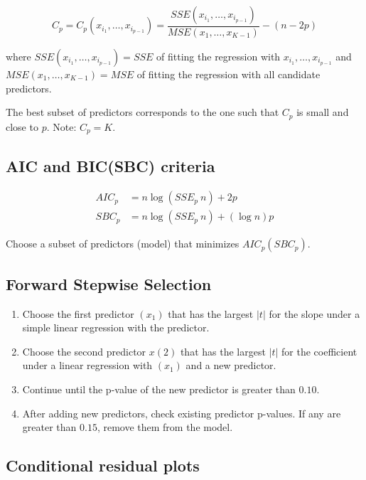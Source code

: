 \documentclass[10pt]{article}
\begin{document}
\begin{multicols}{3}
    \begin{equation}
        C_p = C_p(x_{i_1}, \dots, x_{i_{p-1}}) = \frac{SSE(x_{i_1}, \dots, x_{i_{p-1}})}{MSE(x_1, \dots, x_{K-1})} - (n - 2p)
    \end{equation}

    where $SSE(x_{i_1}, \dots, x_{i_{p-1}}) = SSE$ of fitting the regression with $x_{i_1}, \dots, x_{i_{p-1}}$ and
    $MSE(x_1, \dots, x_{K-1}) = MSE$ of fitting the regression with all candidate predictors.

    The best subset of predictors corresponds to the one such that $C_p$ is small and close to $p$. Note: $C_p = K$.

    \subsection{AIC and BIC(SBC) criteria}

    \begin{align}
        AIC_p & = n \log(SSE_p \ n) + 2p \\
        SBC_p & = n \log(SSE_p \ n) + (\log n)p
    \end{align}

    Choose a subset of predictors (model) that minimizes $AIC_p(SBC_p)$.

    \subsection{Forward Stepwise Selection}

    \begin{enumerate}
        \item Choose the first predictor $(x_1)$ that has the largest $|t|$ for the slope under a simple linear regression with the predictor.
        \item Choose the second predictor $x(2)$ that has the largest $|t|$ for the coefficient under a linear regression with $(x_1)$ and a new predictor.
        \item Continue until the p-value of the new predictor is greater than $0.10$.
        \item After adding new predictors, check existing predictor p-values. If any are greater than $0.15$, remove them from the model.
    \end{enumerate}

    \subsection{Conditional residual plots}


\end{multicols}
\end{document}

